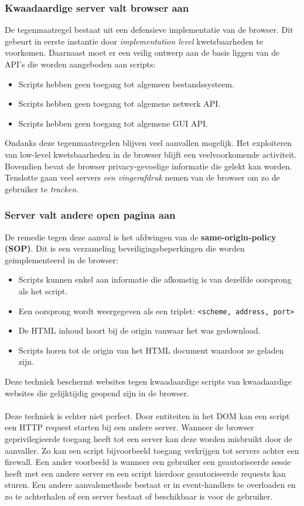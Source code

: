 \documentclass[../main.tex]{subfiles}
\begin{document}
\subsubsection{Kwaadaardige server valt browser aan}
De tegenmaatregel bestaat uit een defensieve implementatie van de browser. Dit gebeurt in eerste instantie door \textit{implementation level} kwetsbaarheden te voorkomen. Daarnaast moet er een veilig ontwerp aan de basis liggen van de API's die worden aangeboden aan scripts:
\begin{itemize}
	\item Scripts hebben geen toegang tot algemeen bestandssysteem.
	\item Scripts hebben geen toegang tot algemene netwerk API.
	\item Scripts hebben geen toegang tot algemene GUI API.
\end{itemize}
Ondanks deze tegenmaatregelen blijven veel aanvallen mogelijk. Het exploiteren van low-level kwetsbaarheden in de browser blijft een veelvoorkomende activiteit. Bovendien bevat de browser privacy-gevoelige informatie die gelekt kan worden. Tenslotte gaan veel servers \textit{een vingerafdruk} nemen van de browser om zo de gebruiker te \textit{tracken}.

\subsubsection{Server valt andere open pagina aan}
De remedie tegen deze aanval is het afdwingen van de \textbf{same-origin-policy (SOP)}. Dit is een verzameling beveiligingsbeperkingen die worden geimplementeerd in de browser:
\begin{itemize}
	\item Scripts kunnen enkel aan informatie die afkomstig is van dezelfde oorsprong als het script.
	\item Een oorsprong wordt weergegeven als een triplet:  \texttt{<scheme, address, port>}
	\item De HTML inhoud hoort bij de origin vanwaar het was gedownload.
	\item Scripts horen tot de origin van het HTML document waardoor ze geladen zijn.
\end{itemize}
Deze techniek beschermt websites tegen kwaadaardige scripts van kwaadaardige websites die gelijktijdig geopend zijn in de browser.
\\\\
Deze techniek is echter niet perfect. Door entiteiten in het DOM kan een script een HTTP request starten bij een andere server. Wanneer de browser geprivilegieerde toegang heeft tot een server kan deze worden misbruikt door de aanvaller. Zo kan een script bijvoorbeeld toegang verkrijgen tot servers achter een firewall. Een ander voorbeeld is wanneer een gebruiker een geautoriseerde sessie heeft met een andere server en een script hierdoor geautoriseerde requests kan sturen. Een andere aanvalsmethode bestaat er in event-handlers te overloaden en zo te achterhalen of een server bestaat of beschikbaar is voor de gebruiker.
\end{document}
